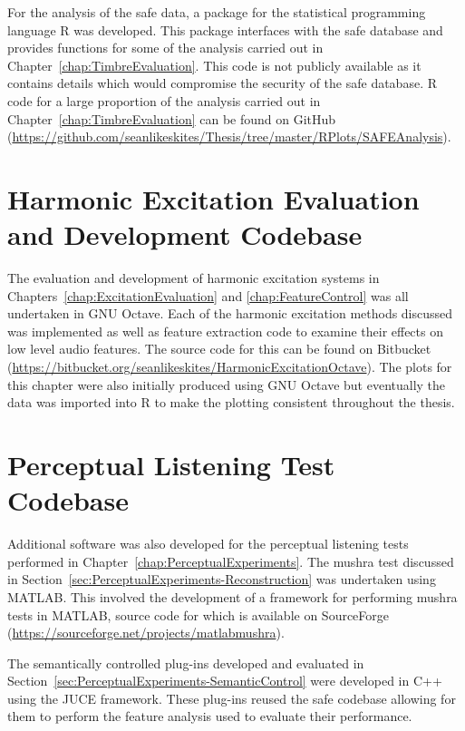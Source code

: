 \begin{appendices}
		For the analysis of the \acrshort{safe} data, a package for the statistical programming language R was
		developed. This package interfaces with the \acrshort{safe} database and provides functions for some of the
		analysis carried out in Chapter~\ref{chap:TimbreEvaluation}. This code is not publicly available as it
		contains details which would compromise the security of the \acrshort{safe} database. R code for a large
		proportion of the analysis carried out in Chapter~\ref{chap:TimbreEvaluation} can be found on GitHub
		(\href{https://github.com/seanlikeskites/Thesis/tree/master/RPlots/SAFEAnalysis}
		{https://github.com/seanlikeskites/Thesis/tree/master/RPlots/SAFEAnalysis}).

	\section{Harmonic Excitation Evaluation and Development Codebase}
		The evaluation and development of harmonic excitation systems in Chapters~\ref{chap:ExcitationEvaluation}
		and \ref{chap:FeatureControl} was all undertaken in GNU Octave. Each of the harmonic excitation methods
		discussed was implemented as well as feature extraction code to examine their effects on low level audio
		features. The source code for this can be found on Bitbucket
		(\href{https://bitbucket.org/seanlikeskites/HarmonicExcitationOctave}
		{https://bitbucket.org/seanlikeskites/HarmonicExcitationOctave}). The plots for this chapter were also
		initially produced using GNU Octave but eventually the data was imported into R to make the plotting
		consistent throughout the thesis.

	\section{Perceptual Listening Test Codebase}
		Additional software was also developed for the perceptual listening tests performed in
		Chapter~\ref{chap:PerceptualExperiments}. The \acrshort{mushra} test discussed in
		Section~\ref{sec:PerceptualExperiments-Reconstruction} was undertaken using MATLAB. This involved the
		development of a framework for performing \acrshort{mushra} tests in MATLAB, source code for which is
		available on SourceForge
		(\href{https://sourceforge.net/projects/matlabmushra}{https://sourceforge.net/projects/matlabmushra}).

		The semantically controlled plug-ins developed and evaluated in
		Section~\ref{sec:PerceptualExperiments-SemanticControl} were developed in C++ using the JUCE framework.
		These plug-ins reused the \acrshort{safe} codebase allowing for them to perform the feature analysis used to
		evaluate their performance.


\end{appendices}
